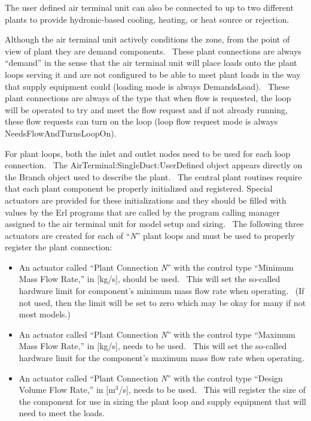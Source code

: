The user defined air terminal unit can also be connected to up to two different plants to provide hydronic-based cooling, heating, or heat source or rejection.

Although the air terminal unit actively conditions the zone, from the point of view of plant they are demand components.~ These plant connections are always ``demand'' in the sense that the air terminal unit will place loads onto the plant loops serving it and are not configured to be able to meet plant loads in the way that supply equipment could (loading mode is always DemandsLoad).~ These plant connections are always of the type that when flow is requested, the loop will be operated to try and meet the flow request and if not already running, these flow requests can turn on the loop (loop flow request mode is always NeedsFlowAndTurnsLoopOn).

For plant loops, both the inlet and outlet nodes need to be used for each loop connection.~ The AirTerminal:SingleDuct:UserDefined object appears directly on the Branch object used to describe the plant.~ The central plant routines require that each plant component be properly initialized and registered. Special actuators are provided for these initializations and they should be filled with values by the Erl programs that are called by the program calling manager assigned to the air terminal unit for model setup and sizing.~ The following three actuators are created for each of ``\emph{N}'' plant loops and must be used to properly register the plant connection:

\begin{itemize}
\item
  An actuator called ``Plant Connection \emph{N}'' with the control type ``Minimum Mass Flow Rate,'' in {[}kg/s{]}, should be used.~ This will set the so-called hardware limit for component's minimum mass flow rate when operating.~ (If not used, then the limit will be set to zero which may be okay for many if not most models.)
\item
  An actuator called ``Plant Connection \emph{N}'' with the control type ``Maximum Mass Flow Rate,'' in {[}kg/s{]}, needs to be used.~ This will set the so-called hardware limit for the component's maximum mass flow rate when operating.
\item
  An actuator called ``Plant Connection \emph{N}'' with the control type ``Design Volume Flow Rate,'' in {[}m\(^{3}\)/s{]}, needs to be used.~ This will register the size of the component for use in sizing the plant loop and supply equipment that will need to meet the loads.
\end{itemize}

